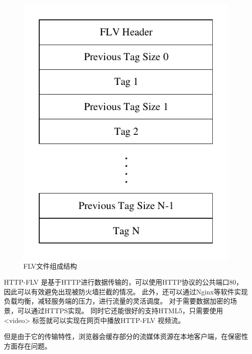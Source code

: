 \begin{figure}[ht]
    \centering
    \includegraphics[scale=1]{./Figure/IMG_flv_file.pdf}
    \caption{FLV文件组成结构}
    \label{Fig:flv_file}
\end{figure}


\newpage
HTTP-FLV 是基于HTTP进行数据传输的，可以使用HTTP协议的公共端口80，
因此可以有效避免出现被防火墙拦截的情况。
此外，还可以通过Nginx等软件实现负载均衡，减轻服务端的压力，进行流量的灵活调度。
对于需要数据加密的场景，可以通过HTTPS实现。
同时它还能很好的支持HTML5，只需要使用 <video> 标签就可以实现在网页中播放HTTP-FLV 视频流。

但是由于它的传输特性，浏览器会缓存部分的流媒体资源在本地客户端，在保密性方面存在问题。


